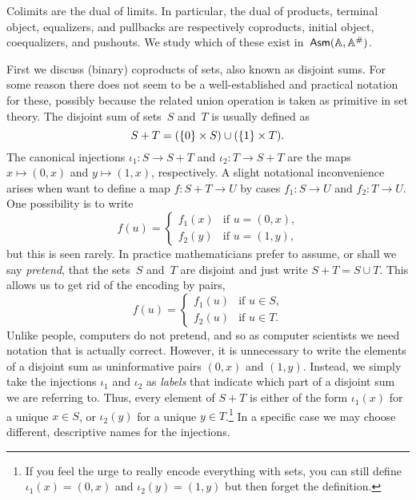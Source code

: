 Colimits are the dual of limits. In particular, the dual of products,
terminal object, equalizers, and pullbacks are respectively
coproducts, initial object, coequalizers, and pushouts. We study which
of these exist in~$\mathsf{Asm}(\mathbb{A},\mathbb{A}^{\#})$.

First we discuss (binary) coproducts of sets, also known as disjoint
sums. For some reason there does not seem to be a well-established and
practical notation for these, possibly because the related union
operation is taken as primitive in set theory. The disjoint sum of
sets~$S$ and~$T$ is usually defined as
%
\begin{equation*}
  S + T = (\{0\} \times S) \cup (\{1\} \times T).
\end{equation*}
%
The canonical injections $\iota_1 : S \to S + T$ and $\iota_2 : T \to
S + T$ are the maps $x \mapsto (0,x)$ and $y \mapsto (1,x)$,
respectively. A slight notational inconvenience arises when want to
define a map $f : S + T \to U$ by cases $f_1 : S \to U$ and $f_2 : T
\to U$. One possibility is to write
%
\begin{equation*}
  f(u) =
  \begin{cases}
    f_1(x) & \text{if $u = (0,x)$,}\\
    f_2(y) & \text{if $u = (1,y)$,}
  \end{cases}
\end{equation*}
%
but this is seen rarely. In practice mathematicians prefer to assume,
or shall we say \emph{pretend}, that the sets~$S$ and~$T$ are disjoint
and just write $S + T = S \cup T$. This allows us to get rid of the
encoding by pairs,
%
\begin{equation*}
  f(u) =
  \begin{cases}
    f_1(u) & \text{if $u \in S$,}\\
   f_2(u) & \text{if $u \in T$.}
  \end{cases}
\end{equation*}
%
Unlike people, computers do not pretend, and so as computer scientists
we need notation that is actually correct. However, it is unnecessary
to write the elements of a disjoint sum as uninformative pairs $(0,x)$
and $(1,y)$. Instead, we simply take the injections $\iota_1$ and
$\iota_2$ as \emph{labels} that indicate which part of a disjoint sum
we are referring to. Thus, every element of $S + T$ is either of the
form $\iota_1(x)$ for a unique $x \in S$, or $\iota_2(y)$ for a unique
$y \in T$.\footnote{If you feel the urge to really encode everything
  with sets, you can still define $\iota_1(x) = (0, x)$ and
  $\iota_2(y) = (1, y)$ but then forget the definition.} In a specific
case we may choose different, descriptive names for the injections.

